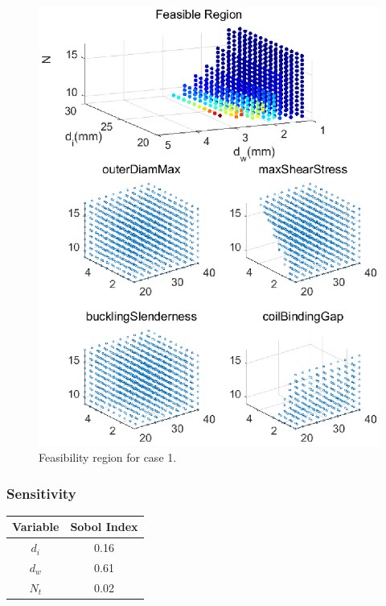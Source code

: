 \documentclass[10pt]{article}
\begin{document}
			\begin{figure}[h!]
		 \begin{center}\includegraphics[scale=.5]{Case_56_38910new.eps}\end{center}
		 \caption{Feasibility region for case 1.}
		 \label{Feasibility region for case 1.}
		 \end{figure}

	
	\subsubsection{Sensitivity}
	
\begin{center}
	 \begin{tabular}{| c  | c |  }
	 	\hline Variable & Sobol Index\\
	 	\hline $d_{i}$ & 0.16 \\
		\hline $d_{w}$ & 0.61  \\
		\hline $N_{t}$ & 0.02 \\ 
		\hline
	 \end{tabular}
\end{center}
\end{document}
